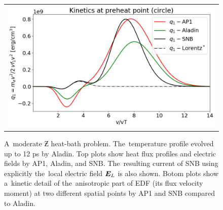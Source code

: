 \begin{figure}[htb]
\begin{center}
\begin{tabular}{c}
      \includegraphics[width=\figscale\textwidth]{../VFPdata/C7_Aladin_case3_nonlocal_kinetics.png}  
    \end{tabular}
  \caption{  
  A~moderate $\Zbar$ heat-bath problem. The~temperature profile evolved 
  up to 12 ps by Aladin.
  Top plots show heat flux profiles and electric fields by AP1, Aladin, 
  and SNB. The~resulting current of SNB using explicitly the~local electric 
  field $\boldsymbol{E}_L$ is also shown. Botom plots show a~kinetic detail of
  the~anisotropic part of EDF (its flux velocity moment) at two different 
  spatial points by AP1 and SNB compared to Aladin. 
  }
  \label{fig:C7_Aladin_case3}
  \end{center} 
\end{figure}


